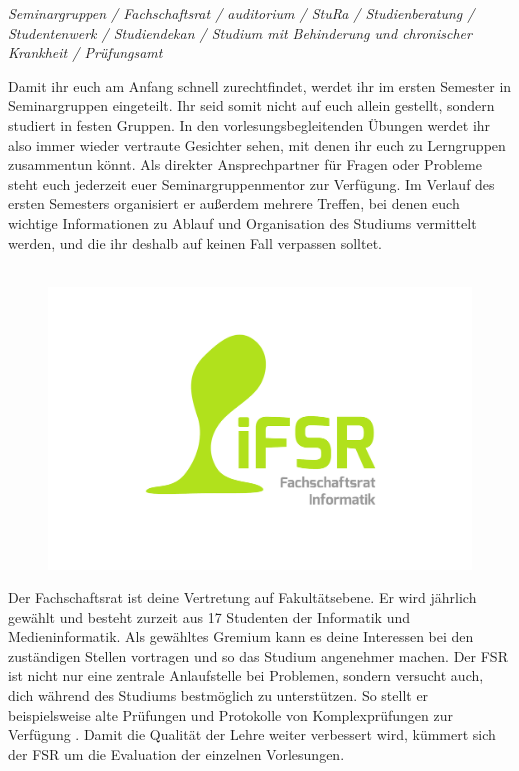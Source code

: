 
\textit{Seminargruppen / Fachschaftsrat / auditorium / StuRa / Studienberatung / Studentenwerk / Studiendekan / Studium mit Behinderung und chronischer Krankheit / Prüfungsamt}

\label{sec:seminargruppen}
Damit ihr euch am Anfang schnell zurechtfindet, werdet ihr im ersten Semester in Seminargruppen eingeteilt.
Ihr seid somit nicht auf euch allein gestellt, sondern studiert in festen Gruppen.
In den vorlesungsbegleitenden Übungen werdet ihr also immer wieder vertraute Gesichter sehen, mit denen ihr euch zu Lerngruppen zusammentun könnt.
Als direkter Ansprechpartner für Fragen oder Probleme steht euch jederzeit euer Seminargruppenmentor zur Verfügung.
Im Verlauf des ersten Semesters organisiert er außerdem mehrere Treffen, bei denen euch wichtige Informationen zu Ablauf und Organisation des Studiums vermittelt werden, und die ihr deshalb auf keinen Fall verpassen solltet.

\label{sec:fachschaftsrat}
\begin{figure}\ \\[-1cm]
\flushright\includegraphics[width=\linewidth, trim=160 150 150 50, clip]{img/fsr_logo}
\end{figure}

Der Fachschaftsrat ist deine Vertretung auf Fakultätsebene.
Er wird jährlich gewählt und besteht zurzeit aus 17 Studenten der Informatik und Medieninformatik.
Als gewähltes Gremium kann es deine Interessen bei den zuständigen Stellen vortragen und so das Studium angenehmer machen.
Der FSR ist nicht nur eine zentrale Anlaufstelle bei Problemen, sondern versucht auch, dich während des Studiums bestmöglich zu unterstützen.
So stellt er beispielsweise alte Prüfungen und Protokolle von Komplexprüfungen zur Verfügung .
Damit die Qualität der Lehre weiter verbessert wird, kümmert sich der FSR um die Evaluation der einzelnen Vorlesungen.

